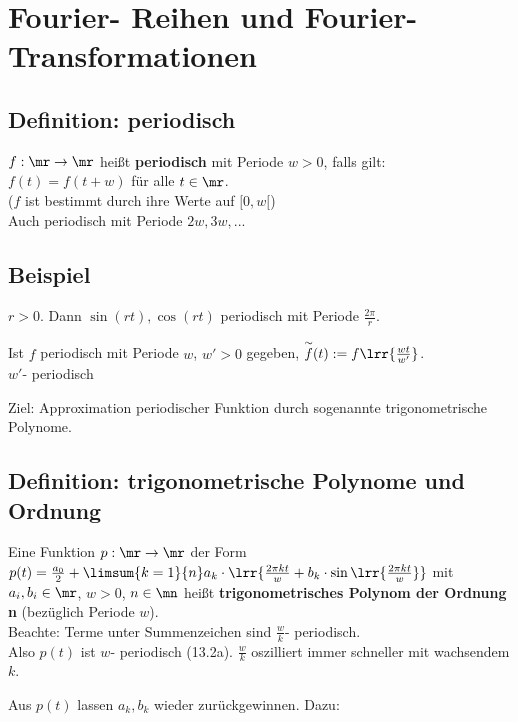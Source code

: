 \newpage
\section{Fourier- Reihen und Fourier- Transformationen}
\subsection{Definition: periodisch}
	$ f:\mr\rightarrow\mr $ heißt \textbf{periodisch} mit Periode $ w>0 $, falls gilt:\\
	$ f(t)=f(t+w) $ für alle $ t\in\mr $.\\
	($ f $ ist bestimmt durch ihre Werte auf $ [0,w[ $)\\
	Auch periodisch mit Periode $ 2w,3w,... $

\subsection{Beispiel}
	\item $ r>0 $. Dann $ \sin(rt),\cos(rt) $ periodisch mit Periode $ \frac{2\pi}{r} $.
	\item Ist $ f $ periodisch mit Periode $ w $, $ w'>0 $ gegeben, $ \overset{\sim}{f}(t):=f\lrr{\frac{wt}{w'}} $.\\
	$ w' $- periodisch
	\subExEnd
	
	Ziel: Approximation periodischer Funktion durch sogenannte trigonometrische Polynome.
	
\subsection{Definition: trigonometrische Polynome und Ordnung}
	Eine Funktion $ p:\mr\rightarrow\mr $ der Form $ p(t)=\frac{a_0}{2}+\limsum{k=1}{n}a_k\cdot\lrr{\frac{2\pi kt}{w}+b_k\cdot\sin\lrr{\frac{2\pi kt}{w}}} $ mit $ a_i,b_i\in\mr $, $ w>0 $, $ n\in\mn $ heißt \textbf{trigonometrisches Polynom der Ordnung n} (bezüglich Periode $ w $).\\
	Beachte: Terme unter Summenzeichen sind $ \frac{w}{k} $- periodisch.\\
	Also $ p(t) $ ist $ w $- periodisch (13.2a).
	$ \frac{w}{k} $ oszilliert immer schneller mit wachsendem $ k $.
	
	Aus $ p(t) $ lassen $ a_k,b_k $ wieder zurückgewinnen. Dazu:


